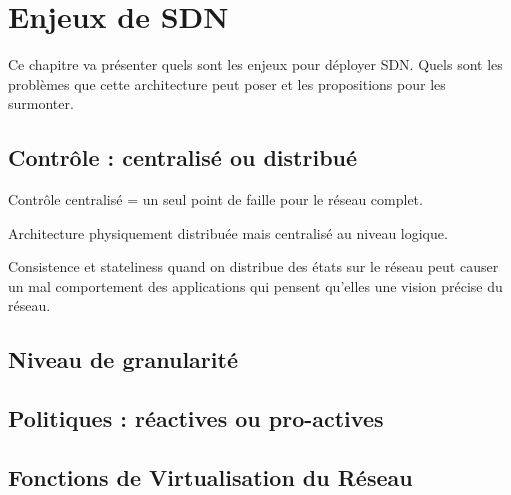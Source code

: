 \chapter{Enjeux de SDN}

Ce chapitre va présenter quels sont les enjeux pour déployer SDN. Quels sont les problèmes que cette architecture peut poser et les propositions pour les surmonter.

\section{Contrôle : centralisé ou distribué}
Contrôle centralisé = un seul point de faille pour le réseau complet.

Architecture physiquement distribuée mais centralisé au niveau logique.

Consistence et stateliness quand on distribue des états sur le réseau peut causer un mal comportement des applications qui pensent qu'elles une vision précise du réseau.

\section{Niveau de granularité}

\section{Politiques : réactives ou pro-actives}

\section{Fonctions de Virtualisation du Réseau}
